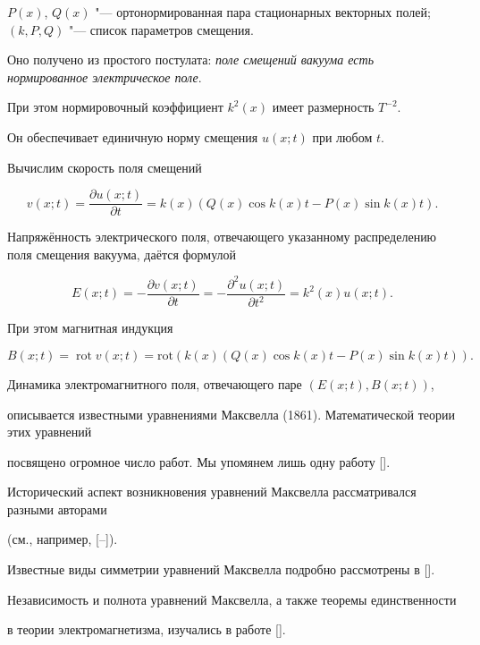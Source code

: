 $P(x)$, $Q(x)$ "--- ортонормированная пара стационарных векторных полей; $(k,P, Q)$ "--- список параметров смещения. 

Оно получено из простого постулата: {\it поле смещений вакуума есть нормированное электрическое поле}\/. 

При этом нормировочный коэффициент $k^2(x)$ имеет размерность $T^{-2}$. 

Он обеспечивает единичную норму смещения $u(x;t)$ при любом $t$.

Вычислим скорость поля смещений 

$$

v(x;t) = \frac{\partial u(x;t)}{\partial t} = k(x)(Q(x) \cos k(x)t - P(x) \sin k(x)t).

$$



Напряжённость электрического поля, отвечающего указанному распределению поля смещения вакуума, даётся формулой 

$$

E(x;t) = -\frac{\partial v(x;t)}{\partial t} = 

-\frac{\partial^2 u(x;t)}{\partial t^2} = k^2(x)u(x;t).

$$

 При этом магнитная индукция

$$

B(x;t) = \mathop{\mathrm{rot}}  v(x;t) = \text{rot}(k(x)(Q(x) \cos k(x)t - P(x) \sin k(x)t)).

$$

  

Динамика электромагнитного поля, отвечающего паре $(E(x;t), B(x;t))$, 

описывается известными уравнениями Максвелла (1861). Математической теории этих уравнений 

посвящено огромное число работ. Мы упомянем лишь одну работу []. 

Исторический аспект возникновения уравнений Максвелла рассматривался разными авторами 

(см., например, [--]).

Известные виды симметрии уравнений Максвелла подробно рассмотрены в [].

Независимость и полнота уравнений Максвелла, а также теоремы единственности 

в теории электромагнетизма, изучались в работе [].







